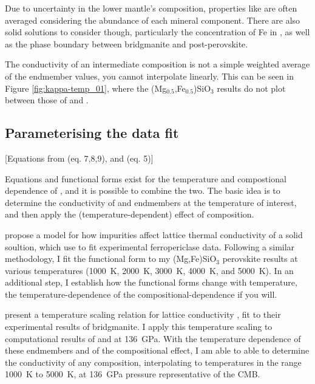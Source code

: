 Due to uncertainty in the lower mantle's composition, properties like \tcs are often averaged considering the abundance of each mineral component. There are also solid solutions to consider though, particularly the concentration of Fe in \mgsio, as well as the phase boundary between bridgmanite and \mgsios post-perovskite. 

The conductivity of an intermediate composition is not a simple weighted average of the endmember values, you cannot interpolate linearly. This can be seen in Figure \ref{fig:kappa-temp_01}, where the (Mg$_{0.5}$,Fe$_{0.5}$)SiO$_3$ results do not plot between those of \mgsios and \fesio.




\subsection{Parameterising the data fit} 

[Equations from \cite{Ohta2017} (eq. 7,8,9), and \cite{Okuda2017} (eq. 5)]

Equations and functional forms exist for the temperature and compostional dependence of \tc, and it is possible to combine the two. The basic idea is to determine the conductivity of \mgsios and \fesios endmembers at the temperature of interest, and then apply the (temperature-dependent) effect of composition.

\citet{Padture1997} propose a model for how impurities affect lattice thermal conductivity of a solid soultion, which \citet{Ohta2017} use to fit experimental ferropericlase data. Following a similar methodology, I fit the functional form to my (Mg,Fe)SiO$_3$ perovskite results at various temperatures (1000~K, 2000~K, 3000~K, 4000~K, and 5000~K). In an additional step, I establish how the functional forms change with temperature, the temperature-dependence of the compositional-dependence if you will.

\citet{Okuda2017} present a temperature scaling relation for lattice conductivity \citep[originally from][]{Manthilake2011}, fit to their experimental results of bridgmanite. I apply this temperature scaling to computational results of \mgsios and \fesios at 136~GPa. With the temperature dependence of these endmembers and of the compositional effect, I am able to able to determine the conductivity of any composition, interpolating to temperatures in the range 1000~K to 5000~K, at 136~GPa pressure representative of the CMB.

